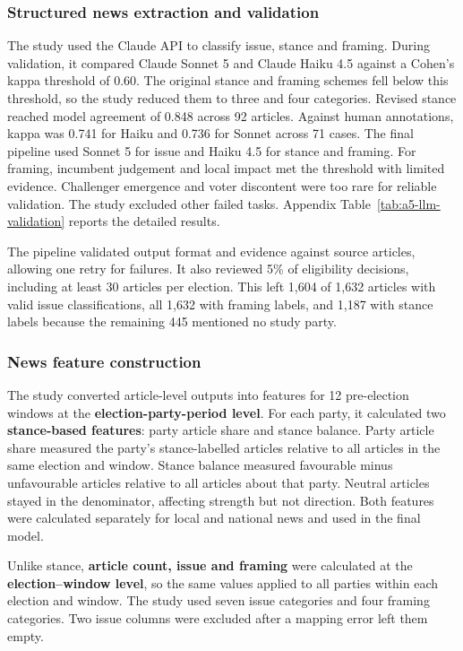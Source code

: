 \documentclass[final-report]{report-template}
\begin{document}
\subsubsection{Structured news extraction and validation} 

The study used the Claude API to classify issue, stance and framing. During validation, it compared Claude Sonnet 5 and Claude Haiku 4.5 against a Cohen's kappa threshold of 0.60. The original stance and framing schemes fell below this threshold, so the study reduced them to three and four categories. Revised stance reached model agreement of 0.848 across 92 articles. Against human annotations, kappa was 0.741 for Haiku and 0.736 for Sonnet across 71 cases. The final pipeline used Sonnet 5 for issue and Haiku 4.5 for stance and framing. For framing, incumbent judgement and local impact met the threshold with limited evidence. Challenger emergence and voter discontent were too rare for reliable validation. The study excluded other failed tasks. Appendix Table~\ref{tab:a5-llm-validation} reports the detailed results.

The pipeline validated output format and evidence against source articles, allowing one retry for failures. It also reviewed 5\% of eligibility decisions, including at least 30 articles per election. This left 1,604 of 1,632 articles with valid issue classifications, all 1,632 with framing labels, and 1,187 with stance labels because the remaining 445 mentioned no study party.

\subsubsection{News feature construction}
\label{sec:news-feature-construction}
The study converted article-level outputs into features for 12 pre-election windows at the \textbf{election-party-period level}. For each party, it calculated two \textbf{stance-based features}: party article share and stance balance. Party article share measured the party's stance-labelled articles relative to all articles in the same election and window. Stance balance measured favourable minus unfavourable articles relative to all articles about that party. Neutral articles stayed in the denominator, affecting strength but not direction. Both features were calculated separately for local and national news and used in the final model.

Unlike stance, \textbf{article count, issue and framing} were calculated at the \textbf{election--window level}, so the same values applied to all parties within each election and window. The study used seven issue categories and four framing categories. Two issue columns were excluded after a mapping error left them empty.
\end{document}
